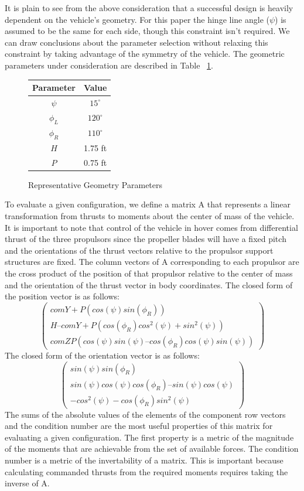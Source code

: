 \documentclass[]{aiaa-tc}%
\begin{document}
It is plain to see from the above consideration that a successful design is heavily dependent on the vehicle's geometry.  For this paper the hinge line angle ($\psi$) is assumed to be the same for each side, though this constraint isn't required. We can draw conclusions about the parameter selection without relaxing this constraint by taking advantage of the symmetry of the vehicle. The geometric parameters under consideration are described in Table ~\ref{fig:geometry}.
\begin{figure}
\begin{center}
\caption{Representative Geometry Parameters}
	\begin{tabular}{| c | c |}
	\hline
	Parameter & Value \\ \hline \hline
 	 $ \psi $  & $15^{\circ}$ \\ \hline
 	 $ \phi_{L} $  & $120^{\circ}$ \\ \hline
 	 $ \phi_{R} $  & $110^{\circ}$ \\ \hline
 	 $ H $ & 1.75 ft\\ \hline
 	 $ P $ & 0.75 ft\\ \hline
 	 
	\end{tabular}
	\label{fig:geometry}
	\end{center}
\end{figure}
To evaluate a given configuration, we define a matrix A that represents a linear transformation from thrusts to moments about the center of mass of the vehicle. It is important to note that control of the vehicle in hover comes from differential thrust of the three propulsors since the propeller blades will have a fixed pitch and the orientations of the thrust vectors relative to the propulsor support structures are fixed.
The column vectors of A corresponding to each propulsor are the cross product of the position of that propulsor relative to the center of mass and the orientation of the thrust vector in body coordinates. The closed form of the position vector is as follows:
\[ \left( \begin{array}{ccc}
comY + P(cos(\psi)sin(\phi_{R})) \\
H– comY +P(cos(\phi_{R})cos^{2}(\psi) + sin^{2}(\psi)) \\
comZP(cos(\psi)sin(\psi) – cos(\phi_{R})cos(\psi)sin(\psi)) \end{array} \right) \]
The closed form of the orientation vector is as follows:
\[ \left( \begin{array}{ccc}
sin(\psi) sin(\phi_{R}) \\
sin(\psi) cos(\psi) cos(\phi_{R}) – sin(\psi) cos(\psi)\\
-cos^{2}(\psi) - cos(\phi_{R})sin^{2}(\psi) \end{array} \right)
 \]
The sums of the absolute values of the elements of the component row vectors and the condition number are the most useful properties of this matrix for evaluating a given configuration. The first property is a metric of the magnitude of the moments that are achievable from the set of available forces. The condition number is a metric of the invertability of a matrix. This is important because calculating commanded thrusts from the required moments requires taking the inverse of A.
\end{document}
